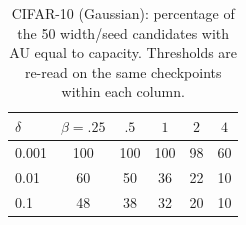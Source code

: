 \begin{table}[H]
\caption{CIFAR-10 (Gaussian): percentage of the 50 width/seed candidates with AU equal to capacity. Thresholds are re-read on the same checkpoints within each column.}\label{tab:delta_rates}
\small
\setlength{\tabcolsep}{3.5pt}
\begin{tabular*}{\textwidth}{@{\extracolsep{\fill}}lccccc@{}}
\toprule
$\delta$ & $\beta=.25$ & $.5$ & $1$ & $2$ & $4$ \\
\midrule
0.001 & 100 & 100 & 100 & 98 & 60 \\
0.01 & 60 & 50 & 36 & 22 & 10 \\
0.1 & 48 & 38 & 32 & 20 & 10 \\
\bottomrule
\end{tabular*}
\end{table}
